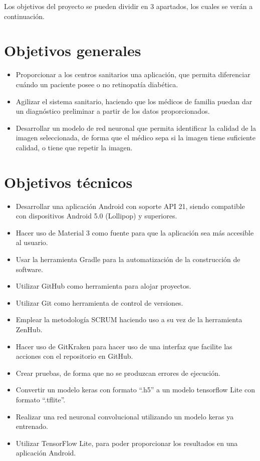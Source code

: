 
Los objetivos del proyecto se pueden dividir en 3 apartados, los cuales se verán a continuación. 
\section{Objetivos generales}
\begin{itemize}
    \item Proporcionar a los centros sanitarios una aplicación, que permita diferenciar cuándo un paciente posee o no retinopatía diabética.
    \item Agilizar el sistema sanitario, haciendo que los médicos de familia puedan dar un diagnóstico preliminar a partir de los datos proporcionados.
    \item Desarrollar un modelo de red neuronal que permita identificar la calidad de la imagen seleccionada, de forma que el médico sepa si la imagen tiene suficiente calidad, o tiene que repetir la imagen.

\end{itemize}
\section{Objetivos técnicos}
\begin{itemize}
    \item Desarrollar una aplicación Android con soporte API 21, siendo compatible con dispositivos Android 5.0 (Lollipop) y superiores.
    \item Hacer uso de Material 3 como fuente para que la aplicación sea más accesible al usuario.
    \item Usar la herramienta Gradle para la automatización de la construcción de software.
    \item Utilizar GitHub como herramienta para alojar proyectos.
    \item Utilizar Git como herramienta de control de versiones.
    \item Emplear la metodología SCRUM haciendo uso a su vez de la herramienta ZenHub.
    \item Hacer uso de GitKraken para hacer uso de una interfaz que facilite las acciones con el repositorio en GitHub.
    \item Crear pruebas, de forma que no se produzcan errores de ejecución.
    \item Convertir un modelo keras con formato ``.h5'' a un modelo tensorflow Lite con formato ``.tflite''.
    \item Realizar una red neuronal convolucional utilizando un modelo keras ya entrenado.
    \item Utilizar TensorFlow Lite, para poder proporcionar los resultados en una aplicación Android.
    
\end{itemize}
